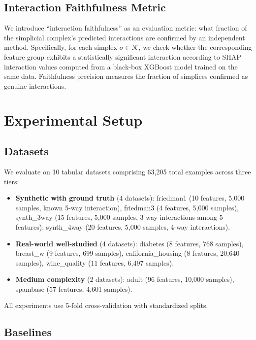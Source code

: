 \documentclass[11pt,letterpaper]{article}
\begin{document}
\subsection{Interaction Faithfulness Metric}
\label{sec:faithfulness}

We introduce ``interaction faithfulness'' as an evaluation metric: what fraction of the simplicial complex's predicted interactions are confirmed by an independent method. Specifically, for each simplex $\sigma \in \mathcal{K}$, we check whether the corresponding feature group exhibits a statistically significant interaction according to SHAP interaction values \citep{Lundberg2017} computed from a black-box XGBoost model trained on the same data. Faithfulness precision measures the fraction of simplices confirmed as genuine interactions.

\section{Experimental Setup}
\label{sec:setup}

\subsection{Datasets}
\label{sec:datasets}

We evaluate on 10 tabular datasets comprising 63,205 total examples across three tiers:

\begin{itemize}
    \item \textbf{Synthetic with ground truth} (4 datasets): friedman1 (10 features, 5{,}000 samples, known 5-way interaction), friedman3 (4 features, 5{,}000 samples), synth\_3way (15 features, 5{,}000 samples, 3-way interactions among 5 features), synth\_4way (20 features, 5{,}000 samples, 4-way interactions).
    \item \textbf{Real-world well-studied} (4 datasets): diabetes (8 features, 768 samples), breast\_w (9 features, 699 samples), california\_housing (8 features, 20{,}640 samples), wine\_quality (11 features, 6{,}497 samples).
    \item \textbf{Medium complexity} (2 datasets): adult (96 features, 10{,}000 samples), spambase (57 features, 4{,}601 samples).
\end{itemize}

All experiments use 5-fold cross-validation with standardized splits.

\subsection{Baselines}
\label{sec:baselines}
\end{document}
